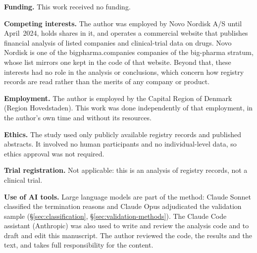 \documentclass[11pt]{article}
\begin{document}
\noindent\textbf{Funding.} This work received no funding.

\noindent\textbf{Competing interests.} The author was employed by Novo Nordisk A/S until April~2024, holds shares in it, and operates a commercial website that publishes financial analysis of listed companies and clinical-trial data on drugs. Novo Nordisk is one of the \num{bigpharma.companies} companies of the big-pharma stratum, whose list mirrors one kept in the code of that website. Beyond that, these interests had no role in the analysis or conclusions, which concern how registry records are read rather than the merits of any company or product.

\noindent\textbf{Employment.} The author is employed by the Capital Region of Denmark (Region Hovedstaden). This work was done independently of that employment, in the author's own time and without its resources.

\noindent\textbf{Ethics.} The study used only publicly available registry records and published abstracts. It involved no human participants and no individual-level data, so ethics approval was not required.

\noindent\textbf{Trial registration.} Not applicable: this is an analysis of registry records, not a clinical trial.

\noindent\textbf{Use of AI tools.} Large language models are part of the method: Claude Sonnet classified the termination reasons and Claude Opus adjudicated the validation sample (\S\ref{sec:classification}, \S\ref{sec:validation-methods}). The Claude Code assistant (Anthropic) was also used to write and review the analysis code and to draft and edit this manuscript. The author reviewed the code, the results and the text, and takes full responsibility for the content.
\end{document}
